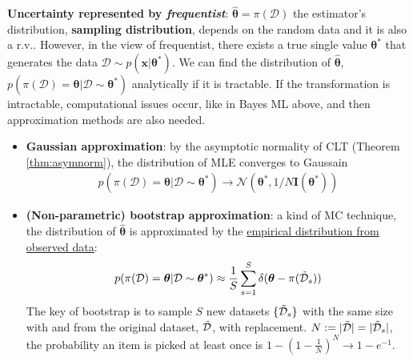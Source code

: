 \textbf{Uncertainty represented by \textit{frequentist}}:
$\hat{\bm{\theta}}=\pi(\mathcal{D})$ the estimator's distribution,
\textbf{sampling distribution},
depends on the random data and it is also a r.v..
However, in the view of frequentist, 
there exists a true single value $\bm{\theta}^*$ that generates the data $\mathcal{D}\sim p(\bm{x}|\bm{\theta}^*)$.
We can find the distribution of $\hat{\bm{\theta}}$, 
$p(\pi(\mathcal{D})=\bm{\theta}|\mathcal{D}\sim\bm{\theta}^*)$ analytically if it is tractable.
If the transformation is intractable, computational issues occur, like in Bayes ML above, and 
then approximation methods are also needed.
\begin{itemize}
    \item \textbf{Gaussian approximation}: 
    by the asymptotic normality of CLT (Theorem \ref{thm:asymnorm}), the distribution of MLE converges to Gaussain
    \begin{gather}
        p(\pi(\mathcal{D})=\bm{\theta}|\mathcal{D}\sim\bm{\theta}^*)
        \to
        \mathcal{N}(\bm{\theta}^*,1/N\mathbf{I}(\bm{\theta}^*))
    \end{gather}
    \item \textbf{(Non-parametric) bootstrap approximation}: a kind of MC technique,
    the distribution of $\hat{\bm{\theta}}$ is approximated 
    by the \uline{empirical distribution from observed data}:
    \begin{gather}
        p(\pi(\mathcal{D})=\bm{\theta}|\mathcal{D}\sim\bm{\theta}^*)
        \approx \frac{1}{S}\sum_{s=1}^S\delta(\bm{\theta}-\pi(\Tilde{\mathcal{D}}_s))
    \end{gather}
    The key of bootstrap is to sample $S$ new datasets $\{\Tilde{\mathcal{D}}_s\}$ with the same size with and from the original dataset,
    $\Tilde{\mathcal{D}}$, with replacement.
    $N:=|\Tilde{\mathcal{D}}|=|\Tilde{\mathcal{D}}_s|$,
    the probability an item is picked at least once is 
    $1-\left(1-\frac{1}{N}\right)^N\to1-e^{-1}$.
\end{itemize}


